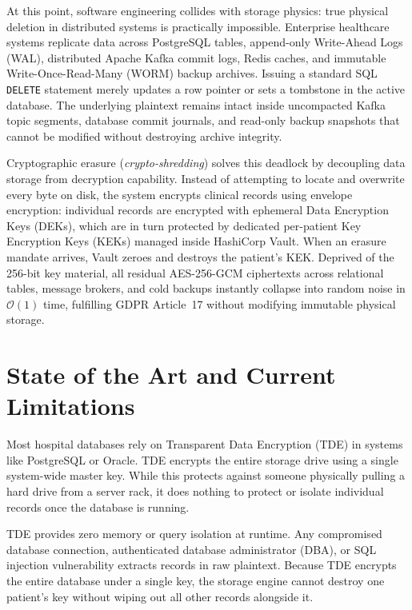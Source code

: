 At this point, software engineering collides with storage physics: true physical deletion in distributed systems is practically impossible. Enterprise healthcare systems replicate data across PostgreSQL tables, append-only Write-Ahead Logs (WAL), distributed Apache Kafka commit logs, Redis caches, and immutable Write-Once-Read-Many (WORM) backup archives. Issuing a standard SQL \texttt{DELETE} statement merely updates a row pointer or sets a tombstone in the active database. The underlying plaintext remains intact inside uncompacted Kafka topic segments, database commit journals, and read-only backup snapshots that cannot be modified without destroying archive integrity.

Cryptographic erasure (\textit{crypto-shredding}) solves this deadlock by decoupling data storage from decryption capability. Instead of attempting to locate and overwrite every byte on disk, the system encrypts clinical records using envelope encryption: individual records are encrypted with ephemeral Data Encryption Keys (DEKs), which are in turn protected by dedicated per-patient Key Encryption Keys (KEKs) managed inside HashiCorp Vault. When an erasure mandate arrives, Vault zeroes and destroys the patient's KEK. Deprived of the 256-bit key material, all residual AES-256-GCM ciphertexts across relational tables, message brokers, and cold backups instantly collapse into random noise in $\mathcal{O}(1)$ time, fulfilling GDPR Article~17 without modifying immutable physical storage.


\section{State of the Art and Current Limitations}\label{section:state-of-the-art}

Most hospital databases rely on Transparent Data Encryption (TDE) in systems like PostgreSQL or Oracle. TDE encrypts the entire storage drive using a single system-wide master key. While this protects against someone physically pulling a hard drive from a server rack, it does nothing to protect or isolate individual records once the database is running.

TDE provides zero memory or query isolation at runtime. Any compromised database connection, authenticated database administrator (DBA), or SQL injection vulnerability extracts records in raw plaintext. Because TDE encrypts the entire database under a single key, the storage engine cannot destroy one patient's key without wiping out all other records alongside it.

